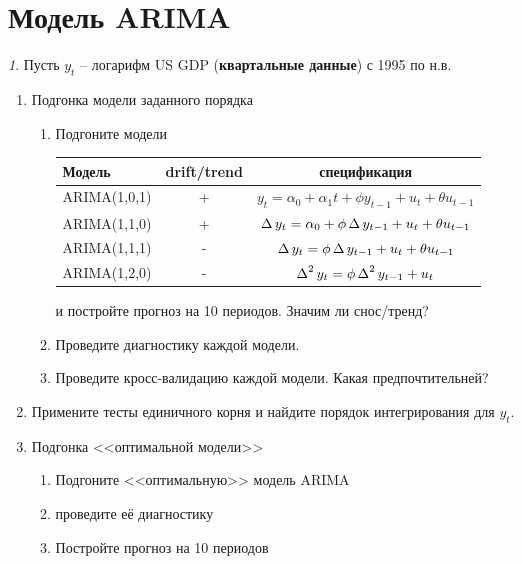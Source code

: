 \documentclass[12pt]{article}
\theoremstyle{remark}
\newtheorem{exercise}{}[subsection]
\begin{document}

\section{Модель ARIMA}


\begin{exercise}
Пусть \(y_t\) -- логарифм US GDP (\textbf{квартальные данные}) с 1995 по н.в.
\begin{enumerate}
	\item Подгонка модели заданного порядка
	\begin{enumerate}
		\item Подгоните модели
		\begin{center}\small
		\begin{tabular}{l|c|c}
			Модель & drift/trend  & спецификация\\ \hline
			ARIMA(1,0,1) & + & \(y_t=\alpha_0+\alpha_1t+\phi y_{t-1}+u_t+\theta u_{t-1}\)\\
			ARIMA(1,1,0) & + & \(\operatorname{\Delta} y_t=\alpha_0+\phi\operatorname{\Delta} y_{t-1}+u_t+\theta u_{t-1}\)\\
			ARIMA(1,1,1) & - & \(\operatorname{\Delta} y_t=\phi\operatorname{\Delta} y_{t-1}+u_t+\theta u_{t-1}\) \\
			ARIMA(1,2,0) & - & \(\operatorname{\Delta}^2 y_t=\phi\operatorname{\Delta}^2 y_{t-1}+u_t\)\\ \hline
		\end{tabular}
		\end{center} 
		и постройте прогноз на 10 периодов. Значим ли снос/тренд?
		\item Проведите диагностику каждой модели.
		\item Проведите кросс-валидацию каждой модели. Какая предпочтительней?
	\end{enumerate}
	\item Примените тесты единичного корня и найдите порядок интегрирования для \(y_t\). 
	\item Подгонка <<оптимальной модели>>
	\begin{enumerate}
		\item Подгоните <<оптимальную>> модель ARIMA
		\item проведите её диагностику
		\item Постройте прогноз на 10 периодов
	\end{enumerate}
\end{enumerate}
\end{exercise}
\end{document}
